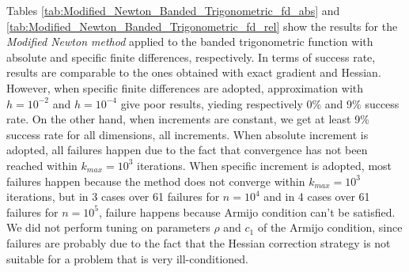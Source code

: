 Tables \ref{tab:Modified_Newton_Banded_Trigonometric_fd_abs} and \ref{tab:Modified_Newton_Banded_Trigonometric_fd_rel} show the results for the \textit{Modified Newton method} applied to the banded trigonometric function with absolute and specific finite differences, respectively.
In terms of success rate, results are comparable to the ones obtained with exact gradient and Hessian.
However, when specific finite differences are adopted, approximation with $h=10^{-2}$ and $h=10^{-4}$ give poor results, yieding respectively 0\% and 9\% success rate.
On the other hand, when increments are constant, we get at least 9\% success rate for all dimensions, all increments.
When absolute increment is adopted, all failures happen due to the fact that convergence has not been reached within $k_{\textit{max}} = 10^3$ iterations.
When specific increment is adopted, most failures happen because the method does not converge within $k_{\textit{max}} = 10^3$ iterations, but in 3 cases over 61 failures for $n=10^4$ and in 4 cases over 61 failures for $n=10^5$, failure happens because Armijo condition can't be satisfied.
We did not perform tuning on parameters $\rho$ and $c_1$ of the Armijo condition, since failures are probably due to the fact that the Hessian correction strategy is not suitable for a problem that is very ill-conditioned.

